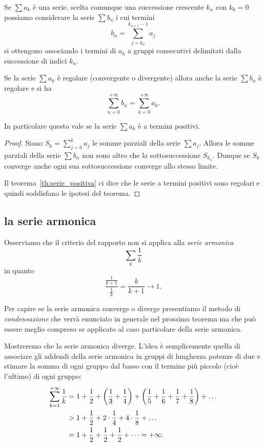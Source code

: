 \begin{theorem}%
\label{th:serie_associativa}%
Se $\sum a_k$ è una serie, scelta comunque
una successione crescente $k_n$ con $k_0=0$
possiamo considerare la serie $\sum b_n$
i cui termini
\[
  b_n = \sum_{j=k_n}^{k_{n+1}-1} a_j
\]
si ottengono associando i termini di $a_k$ a gruppi
consecutivi delimitati dalla successione di indici
$k_n$.

Se la serie $\sum a_k$ è regolare (convergente o divergente)
allora anche la serie $\sum b_n$ è regolare e si ha
\[
\sum_{n=0}^{+\infty} b_n
= \sum_{k=0}^{+\infty} a_k.
\]

In particolare questo vale se la serie $\sum a_k$ è a termini
positivi.
\end{theorem}
%
\begin{proof}
Siano $S_k = \sum_{j=0}^k a_j$ le somme parziali della
serie $\sum a_j$. Allora le somme parziali della serie $\sum b_n$
non sono altro che la sottosuccessione $S_{k_n}$.
Dunque se $S_k$ converge anche ogni sua sottosuccessione
converge allo stesso limite.

Il teorema~\ref{th:serie_positiva} ci dice
che le serie a termini positivi sono regolari e quindi
soddisfano le ipotesi del teorema.
\end{proof}

\subsection{la serie armonica}

Osserviamo che il criterio del rapporto non si applica alla
\emph{serie armonica}%
%
%
\[
  \sum_k \frac{1}{k}
\]
in quanto
\[
 \frac{\frac{1}{k+1}}{\frac{1}{k}}
 = \frac{k}{k+1} \to 1.
\]

Per capire se la serie armonica converge o diverge presentiamo il metodo
di \emph{condensazione} che verrà enunciato in generale nel prossimo teorema
ma che può essere meglio compreso se applicato al caso particolare
della serie armonica.

Mostreremo che la serie armonica diverge.
L'idea è semplicemente quella di associare gli addendi della serie armonica
in gruppi di lunghezza potenze di due e stimare la somma di ogni gruppo dal basso
con il termine più piccolo (cioè l'ultimo) di ogni gruppo:
\begin{align*}
 \sum_{k=1}^{+\infty} \frac{1}{k}
 & = 1 + \frac 1 2
     + {\left( \frac 1 3 + \frac 1 4 \right)}
     + {\left( \frac 1 5 + \frac 1 6 + \frac 1 7 + \frac 1 8 \right)}
     + \dots\\
 & > 1 + \frac 1 2 + 2 \cdot \frac 1 4 + 4 \cdot \frac 1 8 + \dots \\
   & = 1 + \frac 1 2 + \frac 1 2 + \frac 1 2 + \dots
    = +\infty.
\end{align*}

